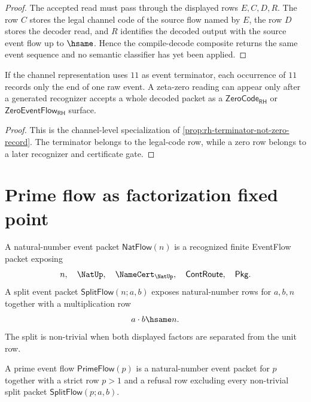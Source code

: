 \begin{proof}
The accepted read must pass through the displayed rows $E,C,D,R$.  The row
$C$ stores the legal channel code of the source flow named by $E$, the row $D$
stores the decoder read, and $R$ identifies the decoded output with the
source event flow up to $\hsame$.  Hence the compile-decode composite returns
the same event sequence and no semantic classifier has yet been applied.
\end{proof}

\begin{corollary}
\label{cor:rh-eventflow-terminator-not-zero-row}
If the channel representation uses $11$ as event terminator, each occurrence
of $11$ records only the end of one raw event.  A zeta-zero reading can appear
only after a generated recognizer accepts a whole decoded packet as a
$\mathsf{ZeroCode}_{\mathsf{RH}}$ or $\mathsf{ZeroEventFlow}_{\mathsf{RH}}$
surface.
\end{corollary}

\begin{proof}
This is the channel-level specialization of
\autoref{prop:rh-terminator-not-zero-record}.  The terminator belongs to the
legal-code row, while a zero row belongs to a later recognizer and certificate
gate.
\end{proof}

\section{Prime flow as factorization fixed point}
\label{sec:rh-prime-flow-factorization-fixed-point}

\begin{definition}
\label{def:rh-arithmetic-event-packets}
A natural-number event packet $\mathsf{NatFlow}(n)$ is a recognized finite
EventFlow packet exposing
$$
n,\quad \NatUp,\quad \NameCert_{\NatUp},\quad
\mathsf{ContRoute},\quad \mathsf{Pkg}.
$$
A split event packet $\mathsf{SplitFlow}(n;a,b)$ exposes natural-number rows
for $a,b,n$ together with a multiplication row
$$
a\cdot b\hsame n.
$$
The split is non-trivial when both displayed factors are separated from the
unit row.
\end{definition}

\begin{definition}
\label{def:rh-prime-event-flow}
A prime event flow $\mathsf{PrimeFlow}(p)$ is a natural-number event packet
for $p$ together with a strict row $p>1$ and a refusal row excluding every
non-trivial split packet $\mathsf{SplitFlow}(p;a,b)$.
\end{definition}

